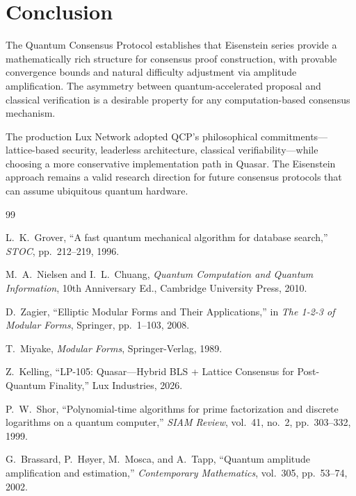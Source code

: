 \section{Conclusion}


The Quantum Consensus Protocol establishes that Eisenstein series
provide a mathematically rich structure for consensus proof
construction, with provable convergence bounds and natural
difficulty adjustment via amplitude amplification. The asymmetry
between quantum-accelerated proposal and classical verification is a
desirable property for any computation-based consensus mechanism.

The production Lux Network adopted QCP's philosophical commitments---
lattice-based security, leaderless architecture, classical
verifiability---while choosing a more conservative implementation path
in Quasar. The Eisenstein approach remains a valid research direction
for future consensus protocols that can assume ubiquitous quantum
hardware.


\begin{thebibliography}{99}

L.~K.~Grover, ``A fast quantum mechanical algorithm for database
search,'' \textit{STOC}, pp.~212--219, 1996.

M.~A.~Nielsen and I.~L.~Chuang, \textit{Quantum Computation and
Quantum Information}, 10th Anniversary Ed., Cambridge University
Press, 2010.

D.~Zagier, ``Elliptic Modular Forms and Their Applications,'' in
\textit{The 1-2-3 of Modular Forms}, Springer, pp.~1--103, 2008.

T.~Miyake, \textit{Modular Forms}, Springer-Verlag, 1989.

Z.~Kelling, ``LP-105: Quasar---Hybrid BLS + Lattice Consensus for
Post-Quantum Finality,'' Lux Industries, 2026.

P.~W.~Shor, ``Polynomial-time algorithms for prime factorization and
discrete logarithms on a quantum computer,'' \textit{SIAM Review},
vol.~41, no.~2, pp.~303--332, 1999.

G.~Brassard, P.~H\o yer, M.~Mosca, and A.~Tapp, ``Quantum amplitude
amplification and estimation,'' \textit{Contemporary Mathematics},
vol.~305, pp.~53--74, 2002.

\end{thebibliography}

